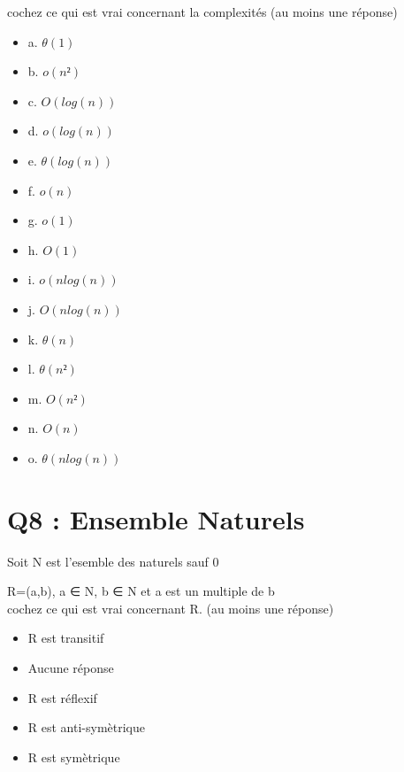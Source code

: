 \vspace{5mm} %

cochez ce qui est vrai concernant la complexités (au moins une réponse)\\
\begin{itemize}[label=$\square$]
\item {a. $\theta(1)$}
\item {b. $o(n²)$}
\item {c. $O(log(n))$}
\item {d. $o(log(n))$}
\item {e. $\theta(log(n))$}
\item {f. $o(n)$}
\item {g. $o(1)$}
\item {h. $O(1)$}
\item {i. $o(n log(n))$}
\item {j. $O(n log(n))$}
\item {k. $\theta(n)$}
\item {l. $\theta(n²)$}
\item {m. $O(n²)$}
\item {n. $O(n)$}
\item {o. $\theta(n log(n))$}
\end{itemize}

\newpage
\section{Q8 : Ensemble Naturels}
\vspace{5mm} %

Soit N est l’esemble des naturels sauf 0

  R={(a,b), a ∈ N, b ∈ N et a est un multiple de b }\\


cochez ce qui est vrai concernant R. (au moins une réponse)\\
\begin{itemize}[label=$\square$]
\item R est transitif
\item Aucune réponse
\item R est réflexif
\item R est anti-symètrique
\item R est symètrique
\end{itemize}
